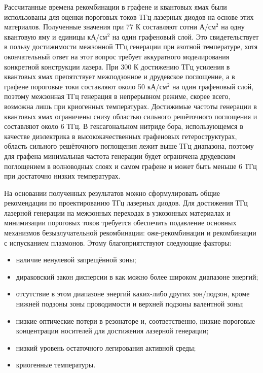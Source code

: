 Рассчитанные времена рекомбинации в графене и квантовых ямах \HgCdTe{} были использованы для оценки пороговых токов ТГц лазерных диодов на основе этих материалов. Полученные значения при 77 К составляют сотни А/см$^2$ на одну квантовую яму и единицы кА/см$^2$ на один графеновый слой. Это свидетельствует в пользу достижимости межзонной ТГц генерации при азотной температуре, хотя окончательный ответ на этот вопрос требует аккуратного моделирования конкретной конструкции лазера. При 300 К достижению ТГц усиления в квантовых ямах \HgCdTe{} препятствует межподзонное и друдевское поглощение, а в графене пороговые токи составляют около 50 кА/см$^2$ на один графеновый слой, поэтому межзонная ТГц генерация в непрерывном режиме, скорее всего, возможна лишь при криогенных температурах. Достижимые частоты генерации в квантовых ямах \HgCdTe{} ограничены снизу областью сильного решёточного поглощения и составляют около 6 ТГц. В гексагональном нитриде бора, использующемся в качестве диэлектрика в высококачественных графеновых гетероструктурах, область сильного решёточного поглощения лежит выше ТГц диапазона, поэтому для графена минимальная частота генерации будет ограничена друдевским поглощением в волноводных слоях и самом графене и может быть меньше 6 ТГц при достаточно низких температурах.

На основании полученных результатов можно сформулировать общие рекомендации по проектированию ТГц лазерных диодов. Для достижения ТГц лазерной генерации на межзонных переходах в узкозонных материалах и минимизации пороговых токов требуется обеспечить подавление основных механизмов безызлучательной рекомбинации: оже-рекомбинации и рекомбинации с испусканием плазмонов. Этому благоприятствуют следующие факторы:
\begin{itemize}
\item наличие ненулевой запрещённой зоны;
\item дираковский закон дисперсии в как можно более широком диапазоне энергий;
\item отсутствие в этом диапазоне энергий каких-либо других зон/подзон, кроме нижней подзоны зоны проводимости и верхней подзоны валентной зоны;
\item низкие оптические потери в резонаторе и, соответственно, низкие пороговые концентрации носителей для достижения лазерной генерации;
\item низкий уровень остаточного легирования активной среды;
\item криогенные температуры.
 \end{itemize}

